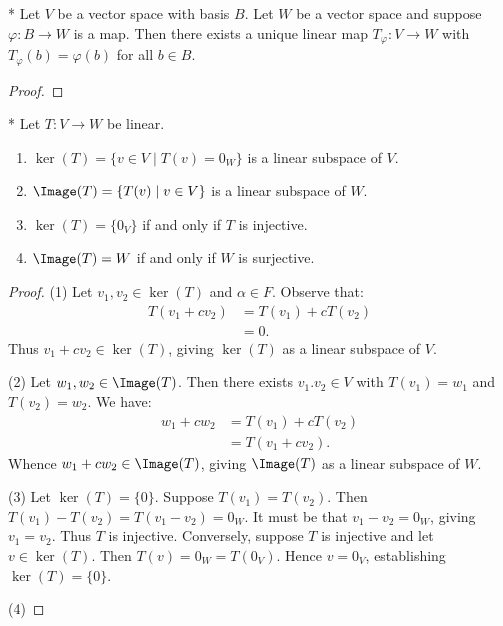     \begin{proposition}*
        Let $V$ be a vector space with basis $B$. Let $W$ be a vector space and suppose $\varphi:B \rightarrow W$ is a map. Then there exists a unique linear map $T_\varphi: V \rightarrow W$ with $T_\varphi(b) = \varphi(b)$ for all $b \in B$.
    \end{proposition}
        \begin{proof}
            
        \end{proof}

    \begin{proposition}*
        Let $T:V \rightarrow W$ be linear.
            \begin{enumerate}[label = (\arabic*),itemsep=1pt,topsep=3pt]
                \item $\ker(T) = \{v \in V \mid T(v) = 0_W\}$ is a linear subspace of $V$.
                \item $\Image(T) = \{T(v) \mid v \in V\}$ is a linear subspace of $W$.
                \item $\ker(T) = \{0_V\}$ if and only if $T$ is injective.
                \item $\Image(T) = W$ if and only if $W$ is surjective.
            \end{enumerate}
    \end{proposition}
        \begin{proof}
            (1) Let $v_1,v_2 \in \ker(T)$ and $\alpha \in F$. Observe that:
                \begin{equation*}
                \begin{split}
                    T(v_1 + cv_2)
                    & = T(v_1) + cT(v_2) \\
                    & = 0.
                \end{split}
                \end{equation*}
            Thus $v_1 + cv_2 \in \ker(T)$, giving $\ker(T)$ as a linear subspace of $V$.

            (2) Let $w_1,w_2 \in \Image(T)$. Then there exists $v_1.v_2 \in V$ with $T(v_1) = w_1$ and $T(v_2) = w_2$. We have:
                \begin{equation*}
                \begin{split}
                    w_1 + cw_2 
                    & = T(v_1) + cT(v_2) \\
                    & = T(v_1 + cv_2).
                \end{split}
                \end{equation*}
            Whence $w_1 + cw_2 \in \Image(T)$, giving $\Image(T)$ as a linear subspace of $W$.

            (3) Let $\ker(T) = \{0\}$. Suppose $T(v_1) = T(v_2)$. Then $T(v_1) - T(v_2) = T(v_1 - v_2) = 0_W$. It must be that $v_1 -v_2 = 0_W$, giving $v_1 = v_2$. Thus $T$ is injective. Conversely, suppose $T$ is injective and let $v \in \ker(T)$. Then $T(v) = 0_W = T(0_V)$. Hence $v = 0_V$, establishing $\ker(T) = \{0\}$.

            (4)
        \end{proof}

